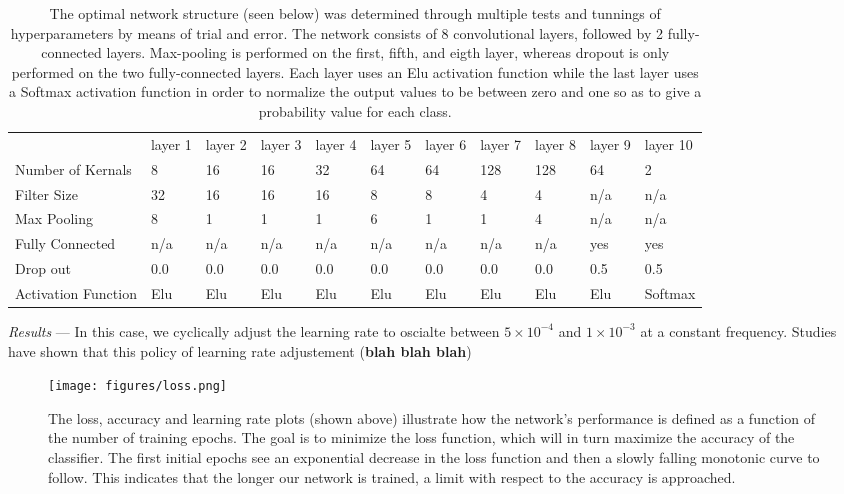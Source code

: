 \documentclass[%
 amsmath,amssymb,
 aps,
 twocolumn,
]{revtex4-1}
\begin{document}
\begin{table}[]
\centering
\caption{The optimal network structure (seen below) was determined through multiple tests and tunnings of hyperparameters by means of trial and error. The network consists of 8 convolutional layers, followed by 2 fully-connected layers. Max-pooling is performed on the first, fifth, and eigth layer, whereas dropout is only performed on the two fully-connected layers. Each layer uses an Elu activation function while the last layer uses a Softmax activation function in order to normalize the output values to be between zero and one so as to give a probability value for each class. \\} 
\label{my-label}
\begin{tabular}{lllllllllll}
                    & layer 1 & layer 2 & layer 3 & layer 4 & layer 5 & layer 6 & layer 7 & layer 8 & layer 9 & layer 10 \\
Number of Kernals   & 8       & 16      & 16      & 32      & 64      & 64      & 128     & 128     & 64      & 2        \\
Filter Size         & 32      & 16      & 16      & 16      & 8       & 8       & 4       & 4       & n/a     & n/a      \\
Max Pooling         & 8       & 1       & 1       & 1       & 6       & 1       & 1       & 4       & n/a     & n/a      \\
Fully Connected     & n/a     & n/a     & n/a     & n/a     & n/a     & n/a     & n/a     & n/a     & yes     & yes      \\
Drop out            & 0.0     & 0.0     & 0.0     & 0.0     & 0.0     & 0.0     & 0.0     & 0.0     & 0.5     & 0.5      \\
Activation Function & Elu     & Elu     & Elu     & Elu     & Elu     & Elu     & Elu     & Elu     & Elu     & Softmax 
\end{tabular}
\end{table}

\textit{Results} --- In this case, we cyclically adjust the learning rate to oscialte between $5 \times 10^{-4}$ and $1 \times 10^{-3}$ at a constant frequency. Studies have shown that this policy of learning rate adjustement (\textbf{blah blah blah})

\begin{figure}[]
 \texttt{[image: figures/loss.png]}
 \caption{\label{fig:loss curve ex} The loss, accuracy and learning rate plots (shown above) illustrate how the network's performance is defined as a function of the number of training epochs. The goal is to minimize the loss function, which will in turn maximize the accuracy of the classifier. The first initial epochs see an exponential decrease in the loss function and then a slowly falling monotonic curve to follow. This indicates that the longer our network is trained, a limit with respect to the accuracy is approached.}
\end{figure}
\end{document}
